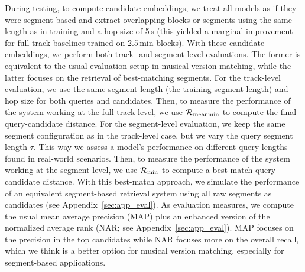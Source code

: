 
During testing, to compute candidate embeddings, we treat all models as if they were segment-based and extract overlapping blocks or segments using the same length as in training and a hop size of 5\,s (this yielded a marginal improvement for full-track baselines trained on 2.5\,min blocks). With these candidate embeddings, we perform both track- and segment-level evaluations. The former is equivalent to the usual evaluation setup in musical version matching, while the latter focuses on the retrieval of best-matching segments. 
For the track-level evaluation, we use the same segment length (the training segment length) and hop size for both queries and candidates. Then, to measure the performance of the system working at the full-track level, we use $\mathcal{R}_{\text{meanmin}}$ to compute the final query-candidate distance. For the segment-level evaluation, we keep the same segment configuration as in the track-level case, but we vary the query segment length $\tau$. This way we assess a model's performance on different query lengths found in real-world scenarios. Then, to measure the performance of the system working at the segment level, we use $\mathcal{R}_{\text{min}}$ to compute a best-match query-candidate distance. With this best-match approach, we simulate the performance of an equivalent segment-based retrieval system using all raw segments as candidates (see Appendix~\ref{sec:app_eval}). 
As evaluation measures, we compute the usual mean average precision (MAP) plus an enhanced version of the normalized average rank (NAR; see Appendix~\ref{sec:app_eval}). MAP focuses on the precision in the top candidates while NAR focuses more on the overall recall, which we think is a better option for musical version matching, especially for segment-based applications. %


